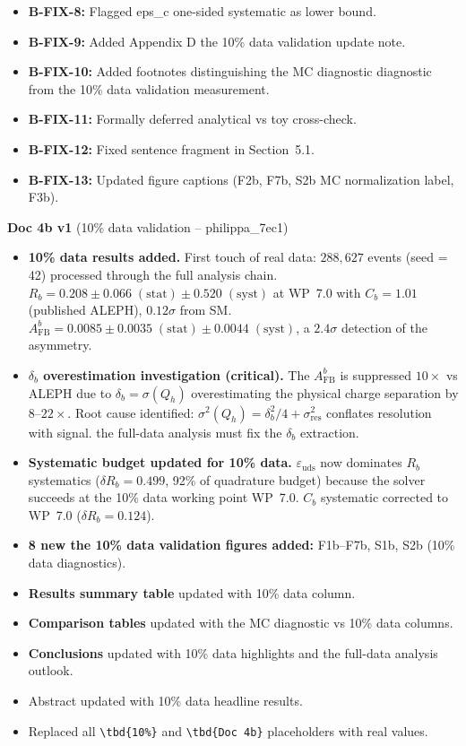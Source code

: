 \documentclass[11pt,a4paper]{article}
\begin{document}
\begin{itemize}
\item \textbf{B-FIX-8:} Flagged eps\_c one-sided systematic as lower bound.
\item \textbf{B-FIX-9:} Added Appendix D the 10\% data validation update note.
\item \textbf{B-FIX-10:} Added footnotes distinguishing the MC diagnostic diagnostic from the 10\% data validation measurement.
\item \textbf{B-FIX-11:} Formally deferred analytical vs toy cross-check.
\item \textbf{B-FIX-12:} Fixed sentence fragment in Section~5.1.
\item \textbf{B-FIX-13:} Updated figure captions (F2b, F7b, S2b MC normalization label, F3b).
\end{itemize}

\textbf{Doc 4b v1} (10\% data validation -- philippa\_7ec1)
\begin{itemize}
\item \textbf{10\% data results added.} First touch of real data: $288{,}627$ events
  (seed = 42) processed through the full analysis chain. $R_b = 0.208 \pm 0.066\;\mathrm{(stat)}
  \pm 0.520\;\mathrm{(syst)}$ at WP~7.0 with $C_b = 1.01$ (published ALEPH),
  $0.12\sigma$ from SM. $A_\mathrm{FB}^b = 0.0085 \pm 0.0035\;\mathrm{(stat)}
  \pm 0.0044\;\mathrm{(syst)}$, a $2.4\sigma$ detection of the asymmetry.
\item \textbf{$\delta_b$ overestimation investigation (critical).} The $A_\mathrm{FB}^b$
  is suppressed $10\times$ vs ALEPH due to $\delta_b = \sigma(Q_h)$ overestimating the
  physical charge separation by $8$--$22\times$. Root cause identified:
  $\sigma^2(Q_h) = \delta_b^2/4 + \sigma_\mathrm{res}^2$ conflates resolution with
  signal. the full-data analysis must fix the $\delta_b$ extraction.
\item \textbf{Systematic budget updated for 10\% data.} $\varepsilon_\mathrm{uds}$
  now dominates $R_b$ systematics ($\delta R_b = 0.499$, 92\% of quadrature budget) because
  the solver succeeds at the 10\% data working point WP~7.0. $C_b$ systematic
  corrected to WP~7.0 ($\delta R_b = 0.124$).
\item \textbf{8 new the 10\% data validation figures added:} F1b--F7b, S1b, S2b (10\% data diagnostics).
\item \textbf{Results summary table} updated with 10\% data column.
\item \textbf{Comparison tables} updated with the MC diagnostic vs 10\% data columns.
\item \textbf{Conclusions} updated with 10\% data highlights and the full-data analysis outlook.
\item Abstract updated with 10\% data headline results.
\item Replaced all \texttt{\textbackslash tbd\{10\%\}} and \texttt{\textbackslash tbd\{Doc 4b\}}
  placeholders with real values.
\end{itemize}
\end{document}
